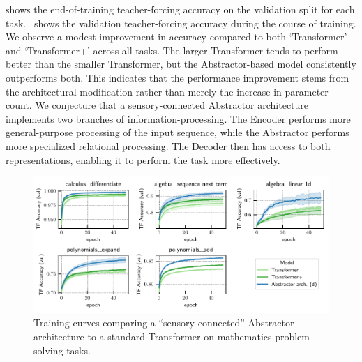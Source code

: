  shows the end-of-training teacher-forcing accuracy on the validation split for each task.~ shows the validation teacher-forcing accuracy during the course of training. We observe a modest improvement in accuracy compared to both `Transformer' and `Transformer+' across all tasks. The larger Transformer tends to perform better than the smaller Transformer, but the Abstractor-based model consistently outperforms both. This indicates that the performance improvement stems from the architectural modification rather than merely the increase in parameter count. We conjecture that a sensory-connected Abstractor architecture implements two branches of information-processing. The Encoder performs more general-purpose processing of the input sequence, while the Abstractor performs more specialized relational processing. The Decoder then has access to both representations, enabling it to perform the task more effectively.

\begin{figure}[t]
    \centering
    \includegraphics[width=\textwidth]{figures/experiments/math_training_curves.pdf}
    \caption{Training curves comparing a ``sensory-connected'' Abstractor architecture to a standard Transformer on mathematics problem-solving tasks.}\label{fig:math_training_curves}
\end{figure}